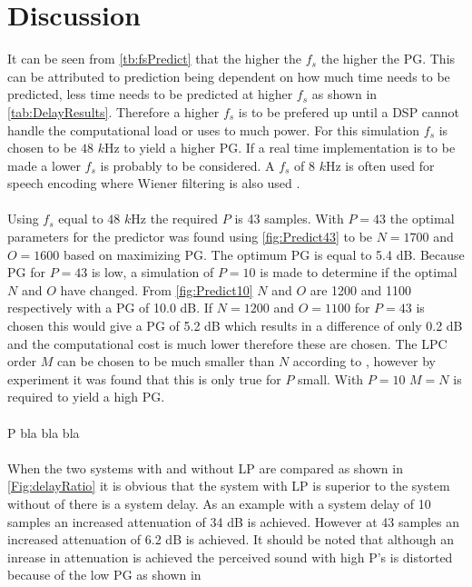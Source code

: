 \section{Discussion}
It can be seen from \autoref{tb:fsPredict} that the higher the $f_s$ the higher the PG. This can be attributed to prediction being dependent on how much time needs to be predicted, less time needs to be predicted at higher $f_s$ as shown in \autoref{tab:DelayResults}.  
Therefore a higher $f_s$ is to be prefered up until a DSP cannot handle the computational load or uses to much power. For this simulation $f_s$ is chosen to be $48$ $k$Hz to yield a higher PG. If a real time implementation is to be made a lower $f_s$ is probably to be considered. A $f_s$ of 8 $k$Hz is often used for speech encoding where Wiener filtering is also used \cite{Speech}.       
\\\\
Using $f_s$ equal to $48$ $k$Hz the required $P$ is 43 samples. With $P=43$ the optimal parameters for the predictor was found using \autoref{fig:Predict43} to be $N=1700$ and $O=1600$ based on maximizing PG. The optimum PG is equal to 5.4 dB. Because PG for $P=43$ is low, a simulation of $P=10$ is made to determine if the optimal $N$ and $O$ have changed. From \autoref{fig:Predict10} $N$ and $O$ are 1200 and 1100 respectively with a PG of 10.0 dB. If $N=1200$ and $O=1100$ for $P=43$ is chosen this would give a PG of 5.2 dB which results in a difference of only 0.2 dB and the computational cost is much lower therefore these are chosen. The LPC order $M$ can be chosen to be much smaller than $N$ according to \cite{Speech}, however by experiment it was found that this is only true for $P$ small. With $P=10$ $M=N$ is required to yield a high PG. 
\\\\
P bla bla bla
\\\\
When the two systems with and without LP are compared as shown in \autoref{Fig:delayRatio} it is obvious that the system with LP is superior to the system without of there is a system delay. As an example with a system delay of 10 samples an increased attenuation of 34 dB is achieved. However at 43 samples an increased attenuation of 6.2 dB is achieved. It should be noted that although an inrease in attenuation is achieved the perceived sound with high P's is distorted because of the low PG as shown in     
